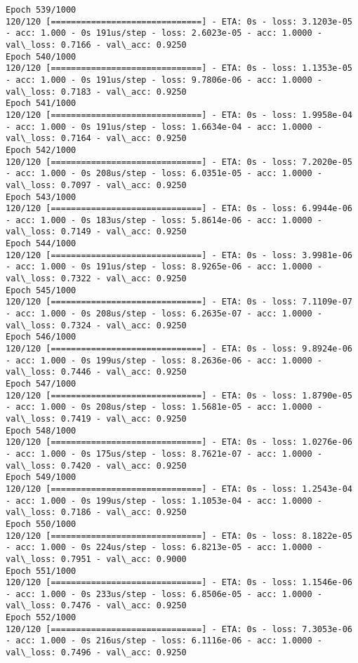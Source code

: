 \documentclass[11pt]{article}
\begin{document}
\begin{Verbatim}[commandchars=\\\{\}]
Epoch 539/1000
120/120 [==============================] - ETA: 0s - loss: 3.1203e-05 - acc: 1.000 - 0s 191us/step - loss: 2.6023e-05 - acc: 1.0000 - val\_loss: 0.7166 - val\_acc: 0.9250
Epoch 540/1000
120/120 [==============================] - ETA: 0s - loss: 1.1353e-05 - acc: 1.000 - 0s 191us/step - loss: 9.7806e-06 - acc: 1.0000 - val\_loss: 0.7183 - val\_acc: 0.9250
Epoch 541/1000
120/120 [==============================] - ETA: 0s - loss: 1.9958e-04 - acc: 1.000 - 0s 191us/step - loss: 1.6634e-04 - acc: 1.0000 - val\_loss: 0.7164 - val\_acc: 0.9250
Epoch 542/1000
120/120 [==============================] - ETA: 0s - loss: 7.2020e-05 - acc: 1.000 - 0s 208us/step - loss: 6.0351e-05 - acc: 1.0000 - val\_loss: 0.7097 - val\_acc: 0.9250
Epoch 543/1000
120/120 [==============================] - ETA: 0s - loss: 6.9944e-06 - acc: 1.000 - 0s 183us/step - loss: 5.8614e-06 - acc: 1.0000 - val\_loss: 0.7149 - val\_acc: 0.9250
Epoch 544/1000
120/120 [==============================] - ETA: 0s - loss: 3.9981e-06 - acc: 1.000 - 0s 191us/step - loss: 8.9265e-06 - acc: 1.0000 - val\_loss: 0.7322 - val\_acc: 0.9250
Epoch 545/1000
120/120 [==============================] - ETA: 0s - loss: 7.1109e-07 - acc: 1.000 - 0s 208us/step - loss: 6.2635e-07 - acc: 1.0000 - val\_loss: 0.7324 - val\_acc: 0.9250
Epoch 546/1000
120/120 [==============================] - ETA: 0s - loss: 9.8924e-06 - acc: 1.000 - 0s 199us/step - loss: 8.2636e-06 - acc: 1.0000 - val\_loss: 0.7446 - val\_acc: 0.9250
Epoch 547/1000
120/120 [==============================] - ETA: 0s - loss: 1.8790e-05 - acc: 1.000 - 0s 208us/step - loss: 1.5681e-05 - acc: 1.0000 - val\_loss: 0.7419 - val\_acc: 0.9250
Epoch 548/1000
120/120 [==============================] - ETA: 0s - loss: 1.0276e-06 - acc: 1.000 - 0s 175us/step - loss: 8.7621e-07 - acc: 1.0000 - val\_loss: 0.7420 - val\_acc: 0.9250
Epoch 549/1000
120/120 [==============================] - ETA: 0s - loss: 1.2543e-04 - acc: 1.000 - 0s 199us/step - loss: 1.1053e-04 - acc: 1.0000 - val\_loss: 0.7186 - val\_acc: 0.9250
Epoch 550/1000
120/120 [==============================] - ETA: 0s - loss: 8.1822e-05 - acc: 1.000 - 0s 224us/step - loss: 6.8213e-05 - acc: 1.0000 - val\_loss: 0.7951 - val\_acc: 0.9000
Epoch 551/1000
120/120 [==============================] - ETA: 0s - loss: 1.1546e-06 - acc: 1.000 - 0s 233us/step - loss: 6.8506e-05 - acc: 1.0000 - val\_loss: 0.7476 - val\_acc: 0.9250
Epoch 552/1000
120/120 [==============================] - ETA: 0s - loss: 7.3053e-06 - acc: 1.000 - 0s 216us/step - loss: 6.1116e-06 - acc: 1.0000 - val\_loss: 0.7496 - val\_acc: 0.9250

\end{Verbatim}
\end{document}
